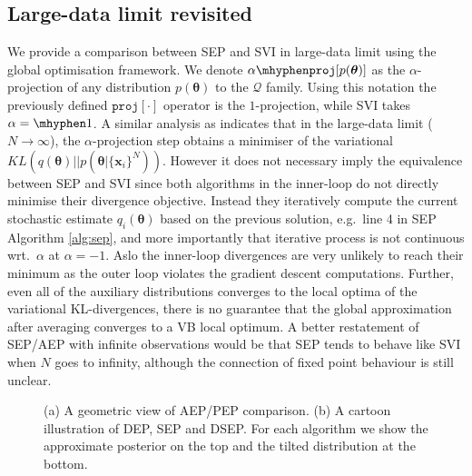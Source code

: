 \subsection{Large-data limit revisited}
We provide a comparison between SEP and SVI in large-data limit using the global optimisation framework. We denote $\alpha \mhyphen \mathtt{proj}[p(\bm{\theta})]$ as the $\alpha$-projection \cite{amari:ig1985} \cite{amari:ig} of any distribution $p(\bm{\theta})$ to the $\mathcal{Q}$ family. Using this notation the previously defined $\mathtt{proj}[\cdot]$ operator is the $1$-projection, while SVI takes $\alpha = \mhyphen 1$. A similar analysis as \cite{amari:alpha_proj} indicates that in the large-data limit ($N \rightarrow \infty$), the $\alpha$-projection step obtains a minimiser of the variational $KL(q(\bm{\theta}) || p(\bm{\theta} | \{\bm{x}_i\}^N))$. However it does not necessary imply the equivalence between SEP and SVI since both algorithms in the inner-loop do not directly minimise their divergence objective. Instead they iteratively compute the current stochastic estimate $q_i(\bm{\theta})$ based on the previous solution, e.g.~line 4 in SEP Algorithm \ref{alg:sep}, and more importantly that iterative process is not continuous wrt.~$\alpha$ at $\alpha = -1$. Aslo the inner-loop divergences are very unlikely to reach their minimum as the outer loop violates the gradient descent computations. Further, even all of the auxiliary distributions converges to the local optima of the variational KL-divergences, there is no guarantee that the global approximation after averaging converges to a VB local optimum. A better restatement of SEP/AEP with infinite observations would be that SEP tends to behave like SVI when $N$ goes to infinity, although the connection of fixed point behaviour is still unclear. 

%
\begin{figure}
\centering
\def\svgwidth{0.35\linewidth}
\subfigure[\label{fig:aep_vs_pep}]{
}
%
\hspace{0.5in}
%
\def\svgwidth{0.4\linewidth}
\subfigure[\label{fig:dep_sep_dsep}]{
}

\caption{(a) A geometric view of AEP/PEP comparison. (b) A cartoon illustration of DEP, SEP and DSEP. For each algorithm we show the approximate posterior on the top and the tilted distribution at the bottom.}

\end{figure}